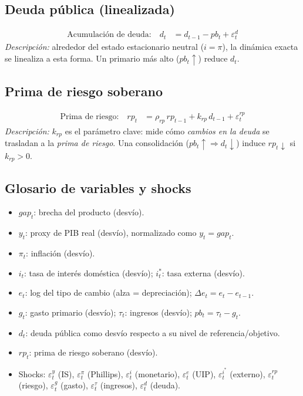 \documentclass[12pt]{article}
\begin{document}
\subsection*{Deuda pública (linealizada)}
\begin{align}
\text{Acumulación de deuda:}\quad 
d_t &= d_{t-1} - pb_t + \varepsilon^d_t \tag{10}
\end{align}
\noindent\emph{Descripción:} alrededor del estado estacionario neutral ($i=\pi$), la dinámica exacta se linealiza a esta forma. Un primario más alto ($pb_t\uparrow$) reduce $d_t$.

\subsection*{Prima de riesgo soberano}
\begin{align}
\text{Prima de riesgo:}\quad 
rp_t &= \rho_{rp}\, rp_{t-1} + k_{rp}\, d_{t-1} + \varepsilon^{rp}_t \tag{11}
\end{align}
\noindent\emph{Descripción:} \textbf{$k_{rp}$} es el parámetro clave: mide cómo \emph{cambios en la deuda} se trasladan a la \emph{prima de riesgo}. Una consolidación ($pb_t\uparrow \Rightarrow d_t\downarrow$) induce $rp_t\downarrow$ si $k_{rp}>0$.


\subsection*{Glosario de variables y shocks}
\begin{itemize}
\item $gap_t$: brecha del producto (desvío).
\item $y_t$: proxy de PIB real (desvío), normalizado como $y_t=gap_t$.
\item $\pi_t$: inflación (desvío).
\item $i_t$: tasa de interés doméstica (desvío); $i^*_t$: tasa externa (desvío).
\item $e_t$: log del tipo de cambio (alza = depreciación); $\Delta e_t = e_t - e_{t-1}$.
\item $g_t$: gasto primario (desvío); $\tau_t$: ingresos (desvío); $pb_t=\tau_t-g_t$.
\item $d_t$: deuda pública como desvío respecto a su nivel de referencia/objetivo.
\item $rp_t$: prima de riesgo soberano (desvío).
\item Shocks: $\varepsilon^y_t$ (IS), $\varepsilon^\pi_t$ (Phillips), $\varepsilon^i_t$ (monetario), 
$\varepsilon^e_t$ (UIP), $\varepsilon^{i^*}_t$ (externo), $\varepsilon^{rp}_t$ (riesgo), 
$\varepsilon^g_t$ (gasto), $\varepsilon^\tau_t$ (ingresos), $\varepsilon^d_t$ (deuda).
\end{itemize}
\end{document}
